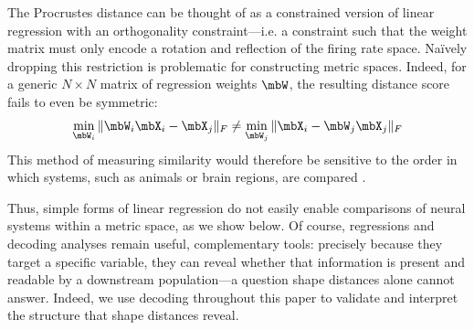 


The Procrustes distance can be thought of as a constrained version of linear regression with an orthogonality constraint---i.e. a constraint such that the weight matrix must only encode a rotation and reflection of the firing rate space.
Na\"ively dropping this restriction is problematic for constructing metric spaces.
Indeed, for a generic $N \times N$ matrix of regression weights $\mbW$, the resulting distance score fails to even be symmetric:
\begin{equation}
\label{eq:naive-regression}
\min_{\mbW_i} \Vert \mbW_i \mbX_i - \mbX_j \Vert_F \neq \min_{\mbW_j} \Vert \mbX_i - \mbW_j \mbX_j \Vert_F
\end{equation}
This method of measuring similarity would therefore be sensitive to the order in which systems, such as animals or brain regions, are compared \parencite{muzellec2026reverse}.

Thus, simple forms of linear regression do not easily enable comparisons of neural systems within a metric space, as we show below.
Of course, regressions and decoding analyses remain useful, complementary tools: precisely because they target a specific variable, they can reveal whether that information is present and readable by a downstream population—a question shape distances alone cannot answer. Indeed, we use decoding throughout this paper to validate and interpret the structure that shape distances reveal.

